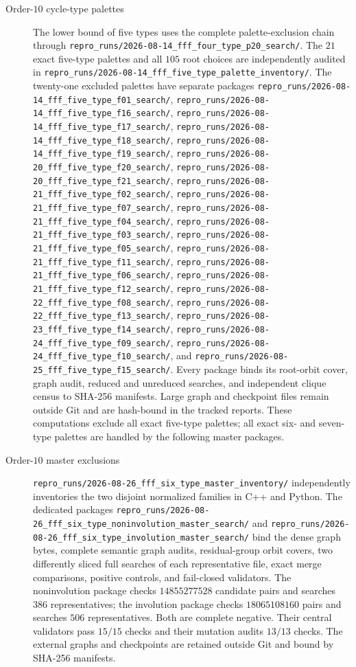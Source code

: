 \begin{description}
\item[Order-$10$ cycle-type palettes]
The lower bound of five types uses the complete palette-exclusion chain
through
\nolinkurl{repro_runs/2026-08-14_fff_four_type_p20_search/}.
The $21$ exact five-type palettes and all $105$ root choices are independently
audited in
\nolinkurl{repro_runs/2026-08-14_fff_five_type_palette_inventory/}.
The twenty-one excluded palettes have separate packages
\nolinkurl{repro_runs/2026-08-14_fff_five_type_f01_search/},
\nolinkurl{repro_runs/2026-08-14_fff_five_type_f16_search/},
\nolinkurl{repro_runs/2026-08-14_fff_five_type_f17_search/},
\nolinkurl{repro_runs/2026-08-14_fff_five_type_f18_search/},
\nolinkurl{repro_runs/2026-08-14_fff_five_type_f19_search/},
\nolinkurl{repro_runs/2026-08-20_fff_five_type_f20_search/},
\nolinkurl{repro_runs/2026-08-20_fff_five_type_f21_search/},
\nolinkurl{repro_runs/2026-08-21_fff_five_type_f02_search/},
\nolinkurl{repro_runs/2026-08-21_fff_five_type_f07_search/},
\nolinkurl{repro_runs/2026-08-21_fff_five_type_f04_search/},
\nolinkurl{repro_runs/2026-08-21_fff_five_type_f03_search/},
\nolinkurl{repro_runs/2026-08-21_fff_five_type_f05_search/},
\nolinkurl{repro_runs/2026-08-21_fff_five_type_f11_search/},
\nolinkurl{repro_runs/2026-08-21_fff_five_type_f06_search/},
\nolinkurl{repro_runs/2026-08-21_fff_five_type_f12_search/},
\nolinkurl{repro_runs/2026-08-22_fff_five_type_f08_search/},
\nolinkurl{repro_runs/2026-08-22_fff_five_type_f13_search/},
\nolinkurl{repro_runs/2026-08-23_fff_five_type_f14_search/},
\nolinkurl{repro_runs/2026-08-24_fff_five_type_f09_search/},
\nolinkurl{repro_runs/2026-08-24_fff_five_type_f10_search/}, and
\nolinkurl{repro_runs/2026-08-25_fff_five_type_f15_search/}.
Every package binds its root-orbit cover, graph audit, reduced and unreduced
searches, and independent clique census to SHA-256 manifests.  Large graph
and checkpoint files remain outside Git and are hash-bound in the tracked
reports. These computations exclude all exact five-type palettes; all exact
six- and seven-type palettes are handled by the following master packages.

\item[Order-$10$ master exclusions]
\nolinkurl{repro_runs/2026-08-26_fff_six_type_master_inventory/}
independently inventories the two disjoint normalized families in C++ and
Python.  The dedicated packages
\nolinkurl{repro_runs/2026-08-26_fff_six_type_noninvolution_master_search/}
and
\nolinkurl{repro_runs/2026-08-26_fff_six_type_involution_master_search/}
bind the dense graph bytes, complete semantic graph audits, residual-group
orbit covers, two differently sliced full searches of each representative
file, exact merge comparisons, positive controls, and fail-closed validators.
The noninvolution package checks $14855277528$ candidate pairs and searches
$386$ representatives; the involution package checks $18065108160$ pairs and
searches $506$ representatives.  Both are complete negative.  Their central
validators pass $15/15$ checks and their mutation audits $13/13$ checks.  The
external graphs and checkpoints are retained outside Git and bound by SHA-256
manifests.


\end{description}
